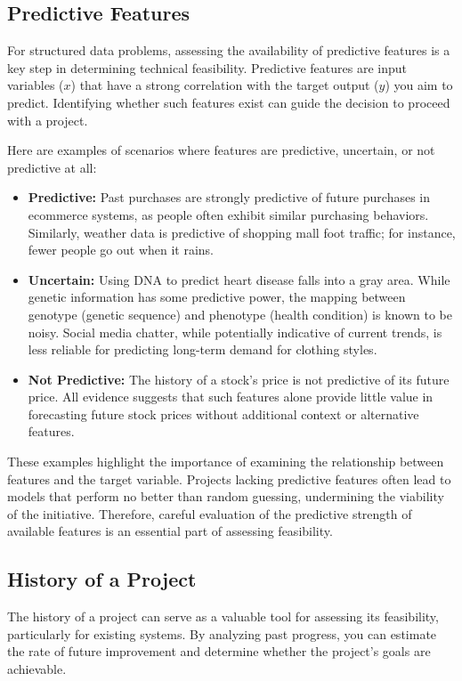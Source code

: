 \documentclass[12pt,openany, draft]{book}
\begin{document}
\subsection{Predictive Features}

For structured data problems, assessing the availability of predictive features is a key step in determining technical feasibility. Predictive features are input variables (\(x\)) that have a strong correlation with the target output (\(y\)) you aim to predict. Identifying whether such features exist can guide the decision to proceed with a project.

Here are examples of scenarios where features are predictive, uncertain, or not predictive at all:
\begin{itemize}
    \item \textbf{Predictive:} Past purchases are strongly predictive of future purchases in ecommerce systems, as people often exhibit similar purchasing behaviors. Similarly, weather data is predictive of shopping mall foot traffic; for instance, fewer people go out when it rains.
    \item \textbf{Uncertain:} Using DNA to predict heart disease falls into a gray area. While genetic information has some predictive power, the mapping between genotype (genetic sequence) and phenotype (health condition) is known to be noisy. Social media chatter, while potentially indicative of current trends, is less reliable for predicting long-term demand for clothing styles.
    \item \textbf{Not Predictive:} The history of a stock's price is not predictive of its future price. All evidence suggests that such features alone provide little value in forecasting future stock prices without additional context or alternative features.
\end{itemize}

These examples highlight the importance of examining the relationship between features and the target variable. Projects lacking predictive features often lead to models that perform no better than random guessing, undermining the viability of the initiative. Therefore, careful evaluation of the predictive strength of available features is an essential part of assessing feasibility.


\subsection{History of a Project}

The history of a project can serve as a valuable tool for assessing its feasibility, particularly for existing systems. By analyzing past progress, you can estimate the rate of future improvement and determine whether the project’s goals are achievable.
\end{document}

